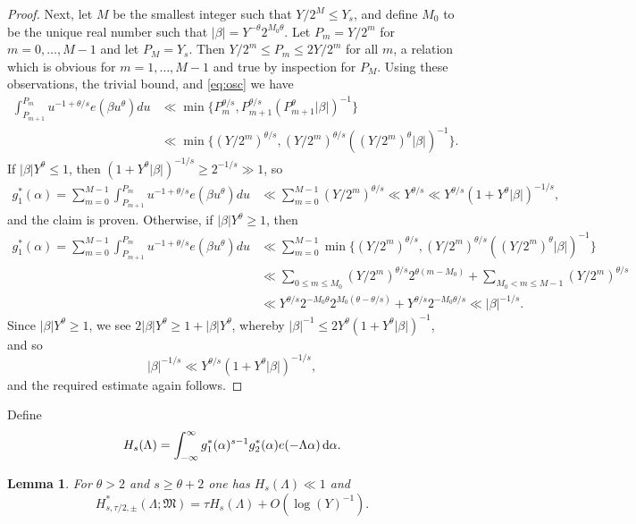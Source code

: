 \documentclass[11pt,reqno]{amsart}
\numberwithin{equation}{section}
\newtheorem{lemma}{Lemma}[section]
\renewcommand{\d}{\,{\rm d}}
\begin{document}
\begin{proof}
Next, let $M$ be the smallest integer such that $Y/2^M \leq Y_s$, and define $M_0$ to be the unique real number such that $|\beta| = Y^{-\theta}2^{M_0\theta}$. Let $P_m = Y/2^m$ for $m = 0, \ldots, M-1$ and let $P_M = Y_s$. Then $Y/2^m \leq P_m \leq 2Y/2^m $ for all $m$, a relation which is obvious for $m = 1,\ldots, M-1$ and true by inspection for $P_M$. Using these observations, the trivial bound, and \eqref{eq:osc} we have 
\begin{align*} \int_{P_{m+1}}^{P_m}u^{-1+\theta/s}e(\beta u^{\theta}) du & \ll \min\{P_m^{\theta/s}, P_{m+1}^{\theta/s}(P^{\theta}_{m+1}|\beta|)^{-1} \} \\ & \ll \min\{(Y/2^m)^{\theta/s}, (Y/2^m)^{\theta/s}((Y/2^m)^{\theta}|\beta|)^{-1} \}. 
\end{align*}
If $|\beta|Y^{\theta} \leq 1$, then $(1+Y^{\theta}|\beta|)^{-1/s} \geq 2^{-1/s} \gg 1$, so 
\begin{align*}
g_1^*(\alpha) = \sum_{m=0}^{M-1} \int_{P_{m+1}}^{P_m}u^{-1+\theta/s}e(\beta u^{\theta}) du & \ll \sum_{m=0}^{M-1} (Y/2^m)^{\theta/s} \ll Y^{\theta/s} \ll Y^{\theta/s}(1+Y^{\theta}|\beta|)^{-1/s}, 
\end{align*}
and the claim is proven. Otherwise, if $|\beta|Y^{\theta} \geq 1$, then 
\begin{align*}
g_1^*(\alpha) = \sum_{m=0}^{M-1} \int_{P_{m+1}}^{P_m}u^{-1+\theta/s}e(\beta u^{\theta}) du & \ll \sum_{m=0}^{M-1} \min\{(Y/2^m)^{\theta/s}, (Y/2^m)^{\theta/s}((Y/2^m)^{\theta}|\beta|)^{-1} \} 
\\ & \ll \sum_{0 \leq m \leq M_0} (Y/2^m)^{\theta/s}2^{\theta(m-M_0)} + \sum_{M_0 < m \leq M-1} (Y/2^m)^{\theta/s} 
\\ & \ll Y^{\theta/s}2^{-M_0\theta} 2^{M_0(\theta-\theta/s)}+Y^{\theta/s}2^{-M_0\theta/s} \ll |\beta|^{-1/s}.
\end{align*} 
Since $|\beta|Y^{\theta} \geq 1$, we see $2|\beta|Y^{\theta} \geq 1+|\beta|Y^{\theta}$, whereby $|\beta|^{-1} \leq 2Y^{\theta}(1+Y^{\theta}|\beta|)^{-1}$, and so 
\[ |\beta|^{-1/s} \ll Y^{\theta/s}(1+Y^{\theta}|\beta|)^{-1/s}, \]
and the required estimate again follows. 
\end{proof}

Define 
\[ H_{s}(\Lambda) = \int_{-\infty}^{\infty} g^*_1(\alpha)^{s-1}g_2^*(\alpha)e(-\Lambda\alpha)\d\alpha. \]

\begin{lemma} \label{lem:finalmajapprox}
For $\theta > 2$ and $s \geq \theta+2$ one has $H_s(\Lambda) \ll 1$ and  
\[ H^*_{s,\tau/2,\pm}(\Lambda;\mathfrak{M}) = \tau H_s(\Lambda)+O(\log(Y)^{-1}). \]
\end{lemma}
\end{document}
